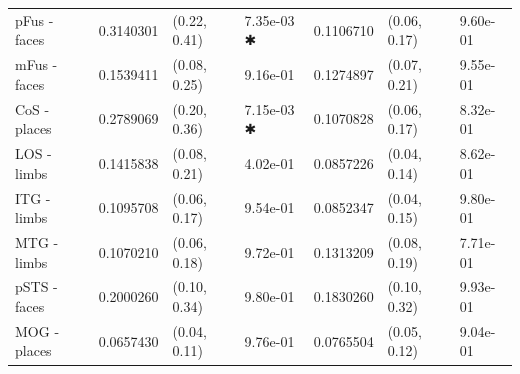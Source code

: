 \begin{ThreePartTable}
\begin{longtable}{lrllrll}
\hspace{1em}\hspace{1em}\hspace{1em}\hspace{1em}pFus - faces & 0.3140301 & (0.22, 0.41) & 7.35e-03 ✱ & 0.1106710 & (0.06, 0.17) & 9.60e-01\\
\hspace{1em}\hspace{1em}\hspace{1em}\hspace{1em}mFus - faces & 0.1539411 & (0.08, 0.25) & 9.16e-01 & 0.1274897 & (0.07, 0.21) & 9.55e-01\\
\hspace{1em}\hspace{1em}\hspace{1em}\hspace{1em}CoS - places & 0.2789069 & (0.20, 0.36) & 7.15e-03 ✱ & 0.1070828 & (0.06, 0.17) & 8.32e-01\\
\hspace{1em}\hspace{1em}\hspace{1em}\hspace{1em}LOS - limbs & 0.1415838 & (0.08, 0.21) & 4.02e-01 & 0.0857226 & (0.04, 0.14) & 8.62e-01\\
\hspace{1em}\hspace{1em}\hspace{1em}\hspace{1em}ITG - limbs & 0.1095708 & (0.06, 0.17) & 9.54e-01 & 0.0852347 & (0.04, 0.15) & 9.80e-01\\
\hspace{1em}\hspace{1em}\hspace{1em}\hspace{1em}MTG - limbs & 0.1070210 & (0.06, 0.18) & 9.72e-01 & 0.1313209 & (0.08, 0.19) & 7.71e-01\\
\hspace{1em}\hspace{1em}\hspace{1em}\hspace{1em}pSTS - faces & 0.2000260 & (0.10, 0.34) & 9.80e-01 & 0.1830260 & (0.10, 0.32) & 9.93e-01\\
\hspace{1em}\hspace{1em}\hspace{1em}\hspace{1em}MOG - places & 0.0657430 & (0.04, 0.11) & 9.76e-01 & 0.0765504 & (0.05, 0.12) & 9.04e-01\\

\end{longtable}
\end{ThreePartTable}
